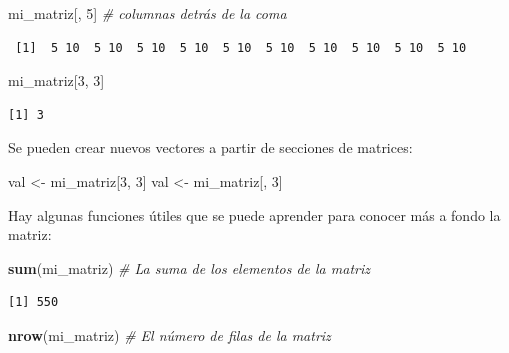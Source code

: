 \documentclass[
]{article}
\newenvironment{Shaded}{\begin{snugshade}}{\end{snugshade}}
\newcommand{\CommentTok}[1]{\textcolor[rgb]{0.56,0.35,0.01}{\textit{#1}}}
\newcommand{\DecValTok}[1]{\textcolor[rgb]{0.00,0.00,0.81}{#1}}
\newcommand{\FunctionTok}[1]{\textcolor[rgb]{0.13,0.29,0.53}{\textbf{#1}}}
\newcommand{\NormalTok}[1]{#1}
\newcommand{\OtherTok}[1]{\textcolor[rgb]{0.56,0.35,0.01}{#1}}
\begin{document}
\begin{Shaded}
\begin{Highlighting}[]
\NormalTok{mi\_matriz[, }\DecValTok{5}\NormalTok{]  }\CommentTok{\# columnas detrás de la coma}
\end{Highlighting}
\end{Shaded}

\begin{verbatim}
 [1]  5 10  5 10  5 10  5 10  5 10  5 10  5 10  5 10  5 10  5 10
\end{verbatim}

\begin{Shaded}
\begin{Highlighting}[]
\NormalTok{mi\_matriz[}\DecValTok{3}\NormalTok{, }\DecValTok{3}\NormalTok{]}
\end{Highlighting}
\end{Shaded}

\begin{verbatim}
[1] 3
\end{verbatim}

Se pueden crear nuevos vectores a partir de secciones de matrices:

\begin{Shaded}
\begin{Highlighting}[]
\NormalTok{val }\OtherTok{\textless{}{-}}\NormalTok{ mi\_matriz[}\DecValTok{3}\NormalTok{, }\DecValTok{3}\NormalTok{]}
\NormalTok{val }\OtherTok{\textless{}{-}}\NormalTok{ mi\_matriz[, }\DecValTok{3}\NormalTok{]}
\end{Highlighting}
\end{Shaded}

Hay algunas funciones útiles que se puede aprender para conocer más a fondo la matriz:

\begin{Shaded}
\begin{Highlighting}[]
\FunctionTok{sum}\NormalTok{(mi\_matriz)  }\CommentTok{\# La suma de los elementos de la matriz}
\end{Highlighting}
\end{Shaded}

\begin{verbatim}
[1] 550
\end{verbatim}

\begin{Shaded}
\begin{Highlighting}[]
\FunctionTok{nrow}\NormalTok{(mi\_matriz)  }\CommentTok{\# El número de filas de la matriz}
\end{Highlighting}
\end{Shaded}
\end{document}
